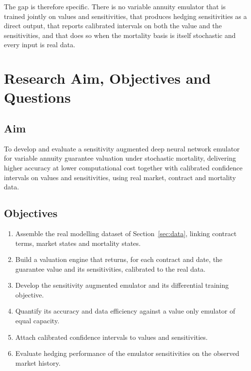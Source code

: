\documentclass[12pt,a4paper]{article}
\begin{document}
The gap is therefore specific. There is no variable annuity emulator that is trained jointly on values and sensitivities, that produces hedging sensitivities as a direct output, that reports calibrated intervals on both the value and the sensitivities, and that does so when the mortality basis is itself stochastic and every input is real data.

\section{Research Aim, Objectives and Questions}
\subsection{Aim}
To develop and evaluate a sensitivity augmented deep neural network emulator for variable annuity guarantee valuation under stochastic mortality, delivering higher accuracy at lower computational cost together with calibrated confidence intervals on values and sensitivities, using real market, contract and mortality data.

\subsection{Objectives}
\begin{enumerate}[label=\arabic*.,leftmargin=*]
\item Assemble the real modelling dataset of Section~\ref{sec:data}, linking contract terms, market states and mortality states.
\item Build a valuation engine that returns, for each contract and date, the guarantee value and its sensitivities, calibrated to the real data.
\item Develop the sensitivity augmented emulator and its differential training objective.
\item Quantify its accuracy and data efficiency against a value only emulator of equal capacity.
\item Attach calibrated confidence intervals to values and sensitivities.
\item Evaluate hedging performance of the emulator sensitivities on the observed market history.
\end{enumerate}
\end{document}
